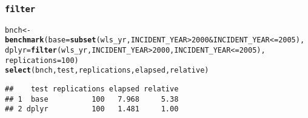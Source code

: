 \documentclass{beamer}\usepackage[]{graphicx}\usepackage[]{color}
\makeatletter
\newcommand{\hlnum}[1]{\textcolor[rgb]{0.686,0.059,0.569}{#1}}%
\newcommand{\hlopt}[1]{\textcolor[rgb]{0,0,0}{#1}}%
\newcommand{\hlstd}[1]{\textcolor[rgb]{0.345,0.345,0.345}{#1}}%
\newcommand{\hlkwb}[1]{\textcolor[rgb]{0.69,0.353,0.396}{#1}}%
\newcommand{\hlkwc}[1]{\textcolor[rgb]{0.333,0.667,0.333}{#1}}%
\newcommand{\hlkwd}[1]{\textcolor[rgb]{0.737,0.353,0.396}{\textbf{#1}}}%
\newenvironment{kframe}{%
 \def\at@end@of@kframe{}%
 \ifinner\ifhmode%
  \def\at@end@of@kframe{\end{minipage}}%
  \begin{minipage}{\columnwidth}%
 \fi\fi%
 \def\FrameCommand##1{\hskip\@totalleftmargin \hskip-\fboxsep
 \colorbox{shadecolor}{##1}\hskip-\fboxsep
     \hskip-\linewidth \hskip-\@totalleftmargin \hskip\columnwidth}%
 \MakeFramed {\advance\hsize-\width
   \@totalleftmargin\z@ \linewidth\hsize
   \@setminipage}}%
 {\par\unskip\endMakeFramed%
 \at@end@of@kframe}
\newenvironment{knitrout}{}{} %
\makeatother
\begin{document}
\begin{frame}[fragile]
  \frametitle{{\tt filter}}
\begin{knitrout}\footnotesize
{}\color{fgcolor}\begin{kframe}
\begin{alltt}
\hlstd{bnch} \hlkwb{<-}
  \hlkwd{benchmark}\hlstd{(}\hlkwc{base} \hlstd{=} \hlkwd{subset}\hlstd{(wls_yr, INCIDENT_YEAR} \hlopt{>} \hlnum{2000} \hlopt{&} \hlstd{INCIDENT_YEAR} \hlopt{<=} \hlnum{2005}\hlstd{),}
            \hlkwc{dplyr} \hlstd{=} \hlkwd{filter}\hlstd{(wls_yr, INCIDENT_YEAR} \hlopt{>} \hlnum{2000}\hlstd{, INCIDENT_YEAR} \hlopt{<=} \hlnum{2005}\hlstd{),}
            \hlkwc{replications} \hlstd{=} \hlnum{100}\hlstd{)}
\hlkwd{select}\hlstd{(bnch, test, replications, elapsed, relative)}
\end{alltt}
\begin{verbatim}
##    test replications elapsed relative
## 1  base          100   7.968     5.38
## 2 dplyr          100   1.481     1.00
\end{verbatim}
\end{kframe}
\end{knitrout}
\end{frame} 
\end{document}
